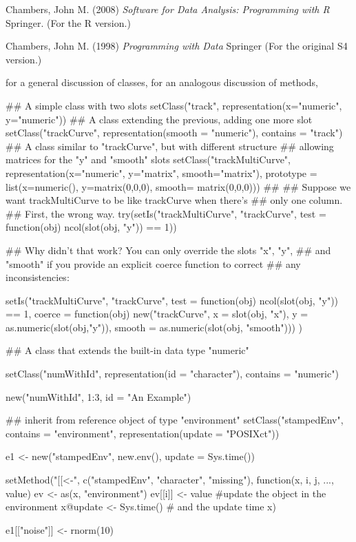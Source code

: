 %
\begin{References}\relax
Chambers, John M. (2008)
\emph{Software for Data Analysis: Programming with R}
Springer.  (For the R version.)

Chambers, John M. (1998)
\emph{Programming with Data}
Springer (For the original S4 version.) 
\end{References}
%
\begin{SeeAlso}\relax
{} for a general discussion of classes,
 for an analogous discussion of methods,
\end{SeeAlso}
%
\begin{Examples}
\begin{ExampleCode}

## A simple class with two slots
setClass("track",
         representation(x="numeric", y="numeric"))
## A class extending the previous, adding one more slot
setClass("trackCurve",
    representation(smooth = "numeric"),
    contains = "track")
## A class similar to "trackCurve", but with different structure
## allowing matrices for the "y" and "smooth" slots
setClass("trackMultiCurve",
         representation(x="numeric", y="matrix", smooth="matrix"),
         prototype = list(x=numeric(), y=matrix(0,0,0),
                          smooth= matrix(0,0,0)))
##
## Suppose we want trackMultiCurve to be like trackCurve when there's
## only one column.
## First, the wrong way.
try(setIs("trackMultiCurve", "trackCurve",
    test = function(obj) {ncol(slot(obj, "y")) == 1}))

## Why didn't that work?  You can only override the slots "x", "y",
## and "smooth" if you provide an explicit coerce function to correct
## any inconsistencies:

setIs("trackMultiCurve", "trackCurve",
  test = function(obj) {ncol(slot(obj, "y")) == 1},
  coerce = function(obj) {
     new("trackCurve",
         x = slot(obj, "x"),
         y = as.numeric(slot(obj,"y")),
         smooth = as.numeric(slot(obj, "smooth")))
  })

## A class that extends the built-in data type "numeric"

setClass("numWithId", representation(id = "character"),
         contains = "numeric")

new("numWithId", 1:3, id = "An Example")

## inherit from reference object of type "environment"
setClass("stampedEnv", contains = "environment",
      representation(update = "POSIXct"))

e1 <- new("stampedEnv", new.env(), update = Sys.time())

setMethod("[[<-", c("stampedEnv", "character", "missing"),
   function(x, i, j, ..., value) {
       ev <- as(x, "environment")
       ev[[i]] <- value  #update the object in the environment
       x@update <- Sys.time() # and the update time
       x})

e1[["noise"]] <- rnorm(10)


\end{ExampleCode}
\end{Examples}
